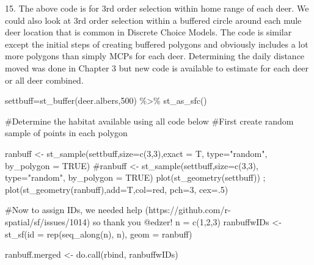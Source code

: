\documentclass[
  letterpaper,
]{book}
\newenvironment{Shaded}{\begin{snugshade}}{\end{snugshade}}
\newcommand{\AttributeTok}[1]{\textcolor[rgb]{0.40,0.45,0.13}{#1}}
\newcommand{\CommentTok}[1]{\textcolor[rgb]{0.37,0.37,0.37}{#1}}
\newcommand{\ConstantTok}[1]{\textcolor[rgb]{0.56,0.35,0.01}{#1}}
\newcommand{\DecValTok}[1]{\textcolor[rgb]{0.68,0.00,0.00}{#1}}
\newcommand{\FunctionTok}[1]{\textcolor[rgb]{0.28,0.35,0.67}{#1}}
\newcommand{\NormalTok}[1]{\textcolor[rgb]{0.00,0.23,0.31}{#1}}
\newcommand{\OtherTok}[1]{\textcolor[rgb]{0.00,0.23,0.31}{#1}}
\newcommand{\SpecialCharTok}[1]{\textcolor[rgb]{0.37,0.37,0.37}{#1}}
\newcommand{\StringTok}[1]{\textcolor[rgb]{0.13,0.47,0.30}{#1}}
\begin{document}
15. The above code is for 3rd order selection within home range of each
deer. We could also look at 3rd order selection within a buffered circle
around each mule deer location that is common in Discrete Choice Models.
The code is similar except the initial steps of creating buffered
polygons and obviously includes a lot more polygons than simply MCPs for
each deer. Determining the daily distance moved was done in Chapter 3
but new code is available to estimate for each deer or all deer
combined.

\begin{Shaded}
\begin{Highlighting}[]
\NormalTok{settbuff}\OtherTok{=}\FunctionTok{st\_buffer}\NormalTok{(deer.albers,}\DecValTok{500}\NormalTok{) }\SpecialCharTok{\%\textgreater{}\%} \FunctionTok{st\_as\_sfc}\NormalTok{()}

\CommentTok{\#Determine the habitat available using all code below}
\CommentTok{\#First create random sample of points in each polygon}

\NormalTok{ranbuff }\OtherTok{\textless{}{-}} \FunctionTok{st\_sample}\NormalTok{(settbuff,}\AttributeTok{size=}\FunctionTok{c}\NormalTok{(}\DecValTok{3}\NormalTok{,}\DecValTok{3}\NormalTok{),}\AttributeTok{exact =}\NormalTok{ T, }\AttributeTok{type=}\StringTok{"random"}\NormalTok{, }\AttributeTok{by\_polygon =} \ConstantTok{TRUE}\NormalTok{)}
\CommentTok{\#ranbuff \textless{}{-} st\_sample(settbuff,size=c(3,3), type="random", by\_polygon = TRUE)}
\FunctionTok{plot}\NormalTok{(}\FunctionTok{st\_geometry}\NormalTok{(settbuff)) ; }\FunctionTok{plot}\NormalTok{(}\FunctionTok{st\_geometry}\NormalTok{(ranbuff),}\AttributeTok{add=}\NormalTok{T,}\AttributeTok{col=}\StringTok{\textquotesingle{}red\textquotesingle{}}\NormalTok{, }\AttributeTok{pch=}\DecValTok{3}\NormalTok{, }\AttributeTok{cex=}\NormalTok{.}\DecValTok{5}\NormalTok{)}

\CommentTok{\#Now to assign IDs, we needed help (https://github.com/r{-}spatial/sf/issues/1014) so thank you @edzer!}
\NormalTok{n }\OtherTok{=} \FunctionTok{c}\NormalTok{(}\DecValTok{1}\NormalTok{,}\DecValTok{2}\NormalTok{,}\DecValTok{3}\NormalTok{)}
\NormalTok{ranbuffwIDs }\OtherTok{\textless{}{-}} \FunctionTok{st\_sf}\NormalTok{(}\AttributeTok{id =} \FunctionTok{rep}\NormalTok{(}\FunctionTok{seq\_along}\NormalTok{(n), n), }\AttributeTok{geom =}\NormalTok{ ranbuff)}

\NormalTok{ranbuff.merged }\OtherTok{\textless{}{-}} \FunctionTok{do.call}\NormalTok{(}\StringTok{\textquotesingle{}rbind\textquotesingle{}}\NormalTok{, ranbuffwIDs)}


\end{Highlighting}
\end{Shaded}
\end{document}
